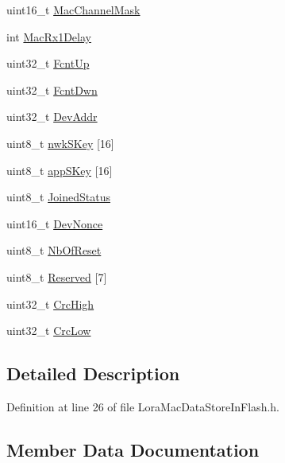 \begin{DoxyCompactItemize}
\item 
uint16\+\_\+t \mbox{\hyperlink{structs_back_up_flash_af9653eb58b4eea0bd814fe175cc65f85}{Mac\+Channel\+Mask}}
\item 
int \mbox{\hyperlink{structs_back_up_flash_a1a196e3ae9619759ae25f5b5ccd64099}{Mac\+Rx1\+Delay}}
\item 
uint32\+\_\+t \mbox{\hyperlink{structs_back_up_flash_aa0c6803486a38093bd0b94cd5853361f}{Fcnt\+Up}}
\item 
uint32\+\_\+t \mbox{\hyperlink{structs_back_up_flash_a56c2f91129afa9d702e322a6af174a85}{Fcnt\+Dwn}}
\item 
uint32\+\_\+t \mbox{\hyperlink{structs_back_up_flash_a2032fb8ac149ddbdd397b070d46c6fda}{Dev\+Addr}}
\item 
uint8\+\_\+t \mbox{\hyperlink{structs_back_up_flash_a36e9fab419d7959dbda8c0ca24cdaf06}{nwk\+S\+Key}} \mbox{[}16\mbox{]}
\item 
uint8\+\_\+t \mbox{\hyperlink{structs_back_up_flash_a8b20dcb0b7253b2125d5116ab68b188e}{app\+S\+Key}} \mbox{[}16\mbox{]}
\item 
uint8\+\_\+t \mbox{\hyperlink{structs_back_up_flash_a294ca0c27de2e0f8b6e0caf67250f419}{Joined\+Status}}
\item 
uint16\+\_\+t \mbox{\hyperlink{structs_back_up_flash_adb12b0a10e2a8ded5388f251ec4d4c17}{Dev\+Nonce}}
\item 
uint8\+\_\+t \mbox{\hyperlink{structs_back_up_flash_a6b1fa618b913d529bac5adaf4ec145dc}{Nb\+Of\+Reset}}
\item 
uint8\+\_\+t \mbox{\hyperlink{structs_back_up_flash_a6163ae953c8ae3245dacc92da79bce16}{Reserved}} \mbox{[}7\mbox{]}
\item 
uint32\+\_\+t \mbox{\hyperlink{structs_back_up_flash_afc534d9e7a3e581783489765b52676a0}{Crc\+High}}
\item 
uint32\+\_\+t \mbox{\hyperlink{structs_back_up_flash_a24f57cec1c39d4972d14bfb65212d74c}{Crc\+Low}}
\end{DoxyCompactItemize}


\subsection{Detailed Description}


Definition at line 26 of file Lora\+Mac\+Data\+Store\+In\+Flash.\+h.



\subsection{Member Data Documentation}
\mbox{\label{structs_back_up_flash_a8b20dcb0b7253b2125d5116ab68b188e}} 
